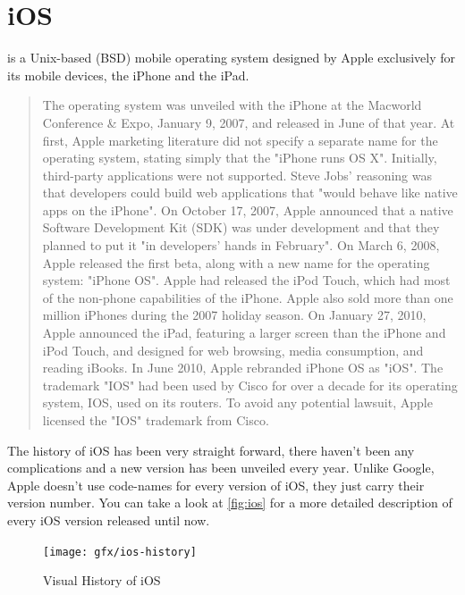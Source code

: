   


\section{iOS}
 is a Unix-based (BSD) mobile operating system designed by Apple exclusively for its mobile devices, the iPhone\textregistered{} and the iPad\textregistered.

\begin{quotation}
    The operating system was unveiled with the iPhone at the Macworld Conference \& Expo, January 9, 2007, and released in June of that year. At first, Apple marketing literature did not specify a separate name for the operating system, stating simply that the "iPhone runs OS X". Initially, third-party applications were not supported. Steve Jobs' reasoning was that developers could build web applications that "would behave like native apps on the iPhone". On October 17, 2007, Apple announced that a native Software Development Kit (SDK) was under development and that they planned to put it "in developers' hands in February". On March 6, 2008, Apple released the first beta, along with a new name for the operating system: "iPhone OS".
Apple had released the iPod Touch, which had most of the non-phone capabilities of the iPhone. Apple also sold more than one million iPhones during the 2007 holiday season. On January 27, 2010, Apple announced the iPad, featuring a larger screen than the iPhone and iPod Touch, and designed for web browsing, media consumption, and reading iBooks.
In June 2010, Apple rebranded iPhone OS as "iOS". The trademark "IOS" had been used by Cisco for over a decade for its operating system, IOS, used on its routers. To avoid any potential lawsuit, Apple licensed the "IOS" trademark from Cisco.
\cite{wikipedia:ios}
\end{quotation}

The history of iOS has been very straight forward, there haven't been any complications and a new version has been unveiled every year. Unlike Google, Apple doesn't use code-names for every version of iOS, they just carry their version number. You can take a look at \autoref{fig:ios} for a more detailed description of every iOS version released until now.  

\begin{figure}[H]
    \begin{center}
        {\texttt{[image: gfx/ios-history]}}
        \caption[Visual History of iOS]{Visual History of iOS\footnotemark}\label{fig:ios}
    \end{center}
\end{figure}
\\

